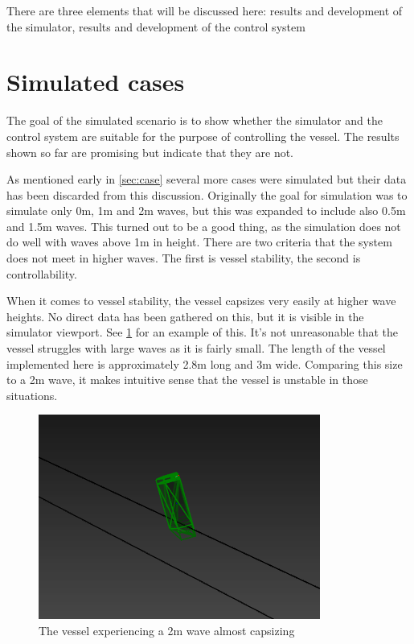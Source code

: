 \documentclass[class=article, crop=false]{standalone}
\begin{document}
There are three elements that will be discussed here: results and development of the simulator, results and development of the control system

\section{Simulated cases}
\label{sec:sim_discussion}
The goal of the simulated scenario is to show whether the simulator and the control system are suitable for the purpose of controlling the vessel. The results shown so far are promising but indicate that they are not.

As mentioned early in \cref{sec:case} several more cases were simulated but their data has been discarded from this discussion. Originally the goal for simulation was to simulate only 0m, 1m and 2m waves, but this was expanded to include also 0.5m and 1.5m waves. This turned out to be a good thing, as the simulation does not do well with waves above 1m in height. There are two criteria that the system does not meet in higher waves. The first is vessel stability, the second is controllability.

When it comes to vessel stability, the vessel capsizes very easily at higher wave heights. No direct data has been gathered on this, but it is visible in the simulator viewport. See \cref{fig:half_capsized} for an example of this. It's not unreasonable that the vessel struggles with large waves as it is fairly small. The length of the vessel implemented here is approximately 2.8m long and 3m wide. Comparing this size to a 2m wave, it makes intuitive sense that the vessel is unstable in those situations.

\begin{figure}
    \centering
    \includegraphics{2m-wave-half-capsized}
    \caption{The vessel experiencing a 2m wave almost capsizing}
    \label{fig:half_capsized}
\end{figure}
\end{document}
